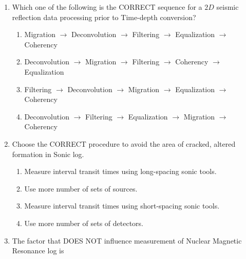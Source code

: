 \documentclass[journal,12pt,onecolumn]{IEEEtran}
\theoremstyle{remark}
\begin{document}
\begin{enumerate}
    \item Which one of the following is the CORRECT sequence for a $2D$ seismic reflection data processing prior to Time-depth conversion? \hfill{}
        \begin{enumerate}
            \item Migration $\rightarrow$ Deconvolution $\rightarrow$ Filtering $\rightarrow$ Equalization $\rightarrow$ Coherency
            \item Deconvolution $\rightarrow$ Migration $\rightarrow$ Filtering $\rightarrow$ Coherency $\rightarrow$ Equalization
            \item Filtering $\rightarrow$ Deconvolution $\rightarrow$ Migration $\rightarrow$ Equalization $\rightarrow$ Coherency
            \item Deconvolution $\rightarrow$ Filtering $\rightarrow$ Equalization $\rightarrow$ Migration $\rightarrow$ Coherency
        \end{enumerate}
    
    \item Choose the CORRECT procedure to avoid the area of cracked, altered formation in Sonic log. \hfill{}
        \begin{enumerate}
                \item Measure interval transit times using long-spacing sonic tools.
                \item Use more number of sets of sources.
                \item Measure interval transit times using short-spacing sonic tools.
                \item Use more number of sets of detectors.
        \end{enumerate}
    
    \item The factor that DOES NOT influence measurement of Nuclear Magnetic Resonance log is \hfill{}
        \begin{enumerate}
        \end{enumerate}
    

\end{enumerate}
\end{document}
